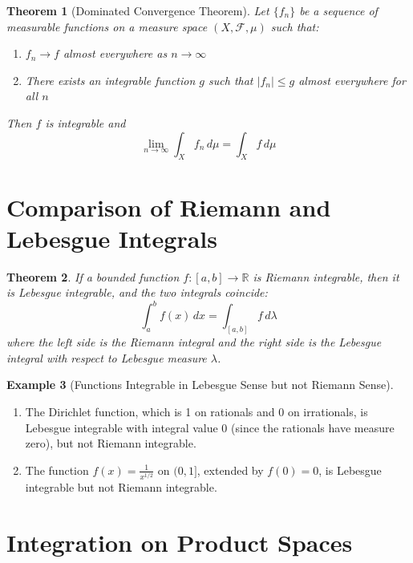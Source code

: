 \documentclass[12pt,a4paper]{article}
\theoremstyle{plain}
\newtheorem{theorem}{Theorem}[section]
\theoremstyle{definition}
\newtheorem{example}[theorem]{Example}
\begin{document}
\begin{theorem}[Dominated Convergence Theorem]
Let $\{f_n\}$ be a sequence of measurable functions on a measure space $(X, \mathcal{F}, \mu)$ such that:
\begin{enumerate}[label=(\roman*)]
\item $f_n \to f$ almost everywhere as $n \to \infty$
\item There exists an integrable function $g$ such that $|f_n| \leq g$ almost everywhere for all $n$
\end{enumerate}
Then $f$ is integrable and
\begin{equation}
\lim_{n \to \infty} \int_X f_n \, d\mu = \int_X f \, d\mu
\end{equation}
\end{theorem}

\section{Comparison of Riemann and Lebesgue Integrals}

\begin{theorem}
If a bounded function $f: [a,b] \to \mathbb{R}$ is Riemann integrable, then it is Lebesgue integrable, and the two integrals coincide:
\begin{equation}
\int_a^b f(x) \, dx = \int_{[a,b]} f \, d\lambda
\end{equation}
where the left side is the Riemann integral and the right side is the Lebesgue integral with respect to Lebesgue measure $\lambda$.
\end{theorem}

\begin{example}[Functions Integrable in Lebesgue Sense but not Riemann Sense]
\begin{enumerate}[label=(\alph*)]
\item The Dirichlet function, which is 1 on rationals and 0 on irrationals, is Lebesgue integrable with integral value 0 (since the rationals have measure zero), but not Riemann integrable.
\item The function $f(x) = \frac{1}{x^{1/2}}$ on $(0,1]$, extended by $f(0) = 0$, is Lebesgue integrable but not Riemann integrable.
\end{enumerate}
\end{example}

\section{Integration on Product Spaces}
\end{document}
